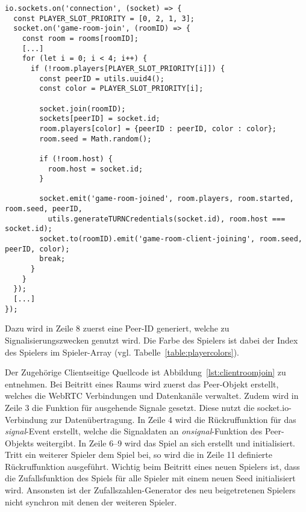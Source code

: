 \lstset{language=js, style=STYLE_CODE_JS}
\begin{minipage}{\textwidth}
\begin{singlespace}
\begin{lstlisting}[caption={Event zum Betreten eines Raums -- Server.js}, captionpos=b, label={lst:join}]
io.sockets.on('connection', (socket) => {
  const PLAYER_SLOT_PRIORITY = [0, 2, 1, 3];
  socket.on('game-room-join', (roomID) => {
    const room = rooms[roomID];
    [...]
    for (let i = 0; i < 4; i++) {
      if (!room.players[PLAYER_SLOT_PRIORITY[i]]) {
        const peerID = utils.uuid4();
        const color = PLAYER_SLOT_PRIORITY[i];

        socket.join(roomID);
        sockets[peerID] = socket.id;
        room.players[color] = {peerID : peerID, color : color};
        room.seed = Math.random();

        if (!room.host) {
          room.host = socket.id;
        }

        socket.emit('game-room-joined', room.players, room.started, room.seed, peerID, 
          utils.generateTURNCredentials(socket.id), room.host === socket.id);
        socket.to(roomID).emit('game-room-client-joining', room.seed, peerID, color);
        break;
      }
    }
  });
  [...]
});
\end{lstlisting}
\end{singlespace}
\end{minipage}

Dazu wird in Zeile 8 zuerst eine Peer-ID generiert, welche zu Signalisierungszwecken genutzt wird. Die \glqq{}Farbe\grqq{} des Spielers ist dabei der Index des Spielers im Spieler-Array (vgl. Tabelle~\ref{table:playercolors}).\par

Der Zugehörige Clientseitige Quellcode ist Abbildung~\ref{lst:clientroomjoin} zu entnehmen. Bei Beitritt eines Raums wird zuerst das Peer-Objekt erstellt, welches die \acs{WebRTC} Verbindungen und Datenkanäle verwaltet. Zudem wird in Zeile 3 die Funktion für ausgehende Signale gesetzt. Diese nutzt die socket.io-Verbindung zur Datenübertragung. In Zeile 4 wird die Rückruffunktion für das \textit{signal}-Event erstellt, welche die Signaldaten an \textit{onsignal}-Funktion des Peer-Objekts weitergibt. In Zeile 6--9 wird das Spiel an sich erstellt und initialisiert. Tritt ein weiterer Spieler dem Spiel bei, so wird die in Zeile 11 definierte Rückruffunktion ausgeführt. Wichtig beim Beitritt eines neuen Spielers ist, dass die Zufallsfunktion des Spiels für alle Spieler mit einem neuen Seed initialisiert wird. Ansonsten ist der Zufallszahlen-Generator des neu beigetretenen Spielers nicht synchron mit denen der weiteren Spieler.

